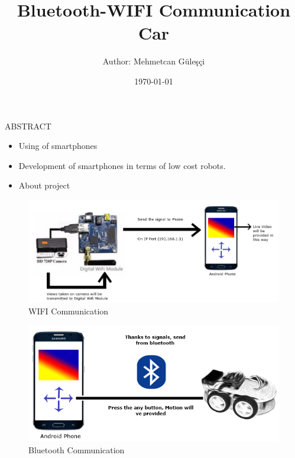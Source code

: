 \documentclass[xcolor=table, 9pt]{beamer}
\title[Thesis]{Bluetooth-WIFI Communication Car}
\author{Author: Mehmetcan Güleşçi} %
\institute[CMPE 491]
{
Istanbul Bilgi University \\
\medskip
\textit{Computer Engineering} 
}
\date{\today} %
\begin{document}
\begin{frame}
\titlepage 
\end{frame}






\begin{frame}{ABSTRACT}
\begin{itemize}
\item Using of smartphones
\item Development of smartphones in terms of low cost robots.
\item About project
\end{itemize}
\end{frame}




\begin{frame}
\begin{figure}
\includegraphics[width=1.08\linewidth]{wificom.png}
\caption{WIFI Communication}
\end{figure}
\end{frame}




\begin{frame}
\begin{figure}
\includegraphics[width=1.05\linewidth]{astractblue.png}
\caption{Bluetooth Communication}
\end{figure}
\end{frame}
\end{document}
